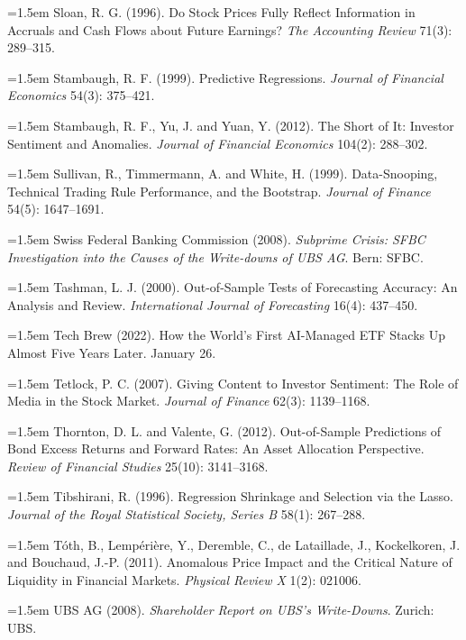 \hangindent=1.5em Sloan, R. G. (1996). Do Stock Prices Fully Reflect Information in Accruals and Cash Flows about Future Earnings? \emph{The Accounting Review} 71(3): 289--315.

\hangindent=1.5em Stambaugh, R. F. (1999). Predictive Regressions. \emph{Journal of Financial Economics} 54(3): 375--421.

\hangindent=1.5em Stambaugh, R. F., Yu, J. and Yuan, Y. (2012). The Short of It: Investor Sentiment and Anomalies. \emph{Journal of Financial Economics} 104(2): 288--302.

\hangindent=1.5em Sullivan, R., Timmermann, A. and White, H. (1999). Data-Snooping, Technical Trading Rule Performance, and the Bootstrap. \emph{Journal of Finance} 54(5): 1647--1691.

\hangindent=1.5em Swiss Federal Banking Commission (2008). \emph{Subprime Crisis: SFBC Investigation into the Causes of the Write-downs of UBS AG}. Bern: SFBC.

\hangindent=1.5em Tashman, L. J. (2000). Out-of-Sample Tests of Forecasting Accuracy: An Analysis and Review. \emph{International Journal of Forecasting} 16(4): 437--450.

\hangindent=1.5em Tech Brew (2022). How the World's First AI-Managed ETF Stacks Up Almost Five Years Later. January 26.

\hangindent=1.5em Tetlock, P. C. (2007). Giving Content to Investor Sentiment: The Role of Media in the Stock Market. \emph{Journal of Finance} 62(3): 1139--1168.

\hangindent=1.5em Thornton, D. L. and Valente, G. (2012). Out-of-Sample Predictions of Bond Excess Returns and Forward Rates: An Asset Allocation Perspective. \emph{Review of Financial Studies} 25(10): 3141--3168.

\hangindent=1.5em Tibshirani, R. (1996). Regression Shrinkage and Selection via the Lasso. \emph{Journal of the Royal Statistical Society, Series B} 58(1): 267--288.

\hangindent=1.5em T\'oth, B., Lemp\'eri\`ere, Y., Deremble, C., de Lataillade, J., Kockelkoren, J. and Bouchaud, J.-P. (2011). Anomalous Price Impact and the Critical Nature of Liquidity in Financial Markets. \emph{Physical Review X} 1(2): 021006.

\hangindent=1.5em UBS AG (2008). \emph{Shareholder Report on UBS's Write-Downs}. Zurich: UBS.

